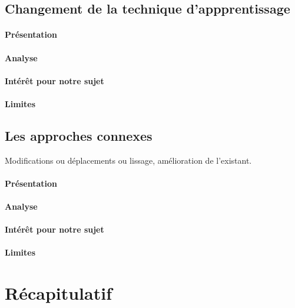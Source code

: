 \documentclass[11pt, french]{report-rd-info}
\begin{document}
\subsection{Changement de la technique d’appprentissage}

\paragraph{Présentation }

\paragraph{Analyse }

\paragraph{Intérêt pour notre sujet }

\paragraph{Limites }

\subsection{Les approches connexes}
Modifications ou déplacements ou lissage, amélioration de l’existant.

\paragraph{Présentation }

\paragraph{Analyse }

\paragraph{Intérêt pour notre sujet }

\paragraph{Limites }

\section{Récapitulatif}
\end{document}
